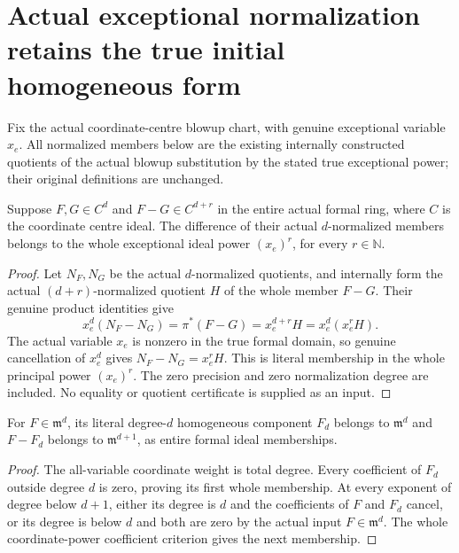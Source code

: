 \section{Actual exceptional normalization retains the true initial homogeneous form}

Fix the actual coordinate-centre blowup chart, with genuine exceptional
variable $x_e$. All normalized members below are the existing internally
constructed quotients of the actual blowup substitution by the stated true
exceptional power; their original definitions are unchanged.

\begin{theorem}
\label{hir:actual-normalized-member-exceptional-precision}
\leanok
Suppose $F,G\in C^d$ and $F-G\in C^{d+r}$ in the entire actual formal ring,
where $C$ is the coordinate centre ideal. The difference of their actual
$d$-normalized members belongs to the whole exceptional ideal power
$(x_e)^r$, for every $r\in\mathbb N$.
\end{theorem}
\begin{proof}
Let $N_F,N_G$ be the actual $d$-normalized quotients, and internally form
the actual $(d+r)$-normalized quotient $H$ of the whole member $F-G$.
Their genuine product identities give
\[
 x_e^d(N_F-N_G)=\pi^*(F-G)=x_e^{d+r}H
 =x_e^d(x_e^rH).
\]
The actual variable $x_e$ is nonzero in the true formal domain, so genuine
cancellation of $x_e^d$ gives $N_F-N_G=x_e^rH$. This is literal membership
in the whole principal power $(x_e)^r$. The zero precision and zero
normalization degree are included. No equality or quotient certificate is
supplied as an input.
\end{proof}

\begin{lemma}
\label{hir:actual-point-homogeneous-remainder-next-power}
\leanok
For $F\in\mathfrak m^d$, its literal degree-$d$ homogeneous component
$F_d$ belongs to $\mathfrak m^d$ and $F-F_d$ belongs to
$\mathfrak m^{d+1}$, as entire formal ideal memberships.
\end{lemma}
\begin{proof}
The all-variable coordinate weight is total degree. Every coefficient of
$F_d$ outside degree $d$ is zero, proving its first whole membership.
At every exponent of degree below $d+1$, either its degree is $d$ and
the coefficients of $F$ and $F_d$ cancel, or its degree is below $d$
and both are zero by the actual input $F\in\mathfrak m^d$.
The whole coordinate-power coefficient criterion gives the next membership.
\end{proof}

